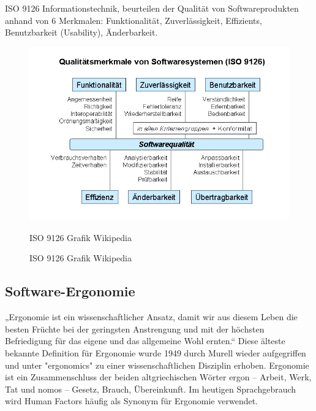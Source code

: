 \documentclass[a4paper, 12pt, twoside, BCOR=20mm, DIV=calc, abstracton, parskip=half*, toc=bibliography, toc=listof, headsepline, footsepline, headings=small, numbers=enddot]{scrreprt}
\begin{document}
	ISO 9126 Informationstechnik, beurteilen der Qualität von Softwareprodukten anhand von 6 Merkmalen: Funktionalität, Zuverlässigkeit, Effizients, Benutzbarkeit (Usability), Änderbarkeit.
	\begin{figure}
	\centering
	\includegraphics{Bild/ISO_9126_Grafik.png}
	\caption{ISO 9126 Grafik Wikipedia}{ISO 9126 Grafik Wikipedia\cite{}}
	\end{figure}
	
	\subsection{Software-Ergonomie}
	„Ergonomie ist ein wissenschaftlicher Ansatz, damit wir aus diesem Leben die besten Früchte bei der geringsten Anstrengung und mit der höchsten Befriedigung für das eigene und das allgemeine Wohl ernten.“\cite[Jastrzebowski 1857]{herczeg2005software} 
	Diese älteste bekannte Definition für Ergonomie wurde 1949 durch Murell wieder aufgegriffen und unter "ergonomics" zu einer wissenschaftlichen Disziplin erhoben. Ergonomie ist ein Zusammenschluss der beiden altgriechischen Wörter ergon – Arbeit, Werk, Tat und nomos – Gesetz, Brauch, Übereinkunft. Im heutigen Sprachgebrauch wird Human Factors häufig als Synonym für Ergonomie verwendet.\cite[]{richter2010usability}
		
\end{document}
